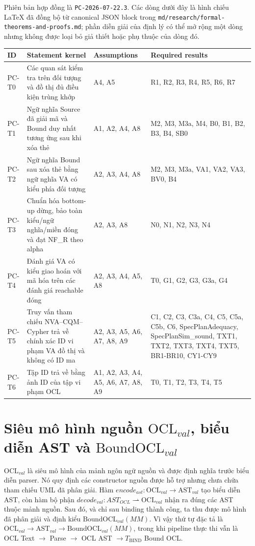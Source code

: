 \documentclass[11pt,a4paper]{article}
\theoremstyle{definition}
\newcommand{\OCLval}{\mathrm{OCL}_{val}}
\newcommand{\ASTval}{\mathrm{AST}_{val}}
\newcommand{\BoundOCLval}{\mathrm{BoundOCL}_{val}}
\begin{document}
Phiên bản hợp đồng là \texttt{PC-2026-07-22.3}. Các dòng dưới đây là hình chiếu
LaTeX đã đồng bộ từ canonical JSON block trong
\texttt{md/research/formal-theorems-and-proofs.md}; phần
diễn giải của định lý có thể mở rộng một dòng nhưng không được loại bỏ giả
thiết hoặc phụ thuộc của dòng đó.

\begin{longtable}{p{1.2cm}p{4.5cm}p{2.4cm}p{5.0cm}}
\toprule
ID & Statement kernel & Assumptions & Required results\\
\midrule
PC-T0 & Các quan sát kiểm tra trên đối tượng và đồ thị đủ điều kiện trùng khớp & A4, A5 & R1, R2, R3, R4, R5, R6, R7\\
PC-T1 & Ngữ nghĩa Source đã giải mã và Bound duy nhất tương ứng sau khi xóa thẻ & A1, A2, A4, A8 & M2, M3, M3a, M4, B0, B1, B2, B3, B4, SB0\\
PC-T2 & Ngữ nghĩa Bound sau xóa thẻ bằng ngữ nghĩa VA có kiểu phía đối tượng & A2, A3, A4, A8 & M2, M3, M3a, VA1, VA2, VA3, BV0, B4\\
PC-T3 & Chuẩn hóa bottom-up dừng, bảo toàn kiểu/ngữ nghĩa/miền đóng và đạt NF\_R theo alpha & A2, A3, A8 & N0, N1, N2, N3, N4\\
PC-T4 & Đánh giá VA có kiểu giao hoán với mã hóa trên các đánh giá reachable đóng & A2, A3, A4, A5, A8 & T0, G1, G2, G3, G3a, G4\\
PC-T5 & Truy vấn tham chiếu NVA--CQM--Cypher trả về chính xác ID vi phạm VA đồ thị và không có ID ma & A2, A3, A5, A6, A7, A8, A9 & C1, C2, C3, C3a, C4, C5, C5a, C5b, C6, SpecPlanAdequacy, SpecPlanSim_sound, TXT1, TXT2, TXT3, TXT4, TXT5, BR1-BR10, CY1-CY9\\
PC-T6 & Tập ID trả về bằng ảnh ID của tập vi phạm OCL & A1, A2, A3, A4, A5, A6, A7, A8, A9 & T0, T1, T2, T3, T4, T5\\
\bottomrule
\end{longtable}

\section{Siêu mô hình nguồn $\OCLval$, biểu diễn AST và $\BoundOCLval$}

$\OCLval$ là siêu mô hình của mảnh ngôn ngữ nguồn và được định nghĩa trước biểu
diễn parser. Nó quy định các constructor nguồn được hỗ trợ nhưng chưa chứa tham
chiếu UML đã phân giải. Hàm $encode_{ast}:\OCLval\to\ASTval$ tạo biểu diễn AST,
còn hàm bộ phận $decode_{val}:AST_{OCL}\rightharpoonup\OCLval$ nhận ra đúng các
AST thuộc mảnh nguồn. Sau đó, và chỉ sau binding thành công, ta thu được mô hình
đã phân giải và định kiểu $\BoundOCLval(MM)$. Vì vậy thứ tự đặc tả là
$\OCLval\to\ASTval\to\BoundOCLval(MM)$, trong khi pipeline thực thi vẫn là
OCL Text $\to$ Parse $\to$ OCL AST $\to T_{\mathrm{BIND}}$ Bound OCL.
\end{document}

